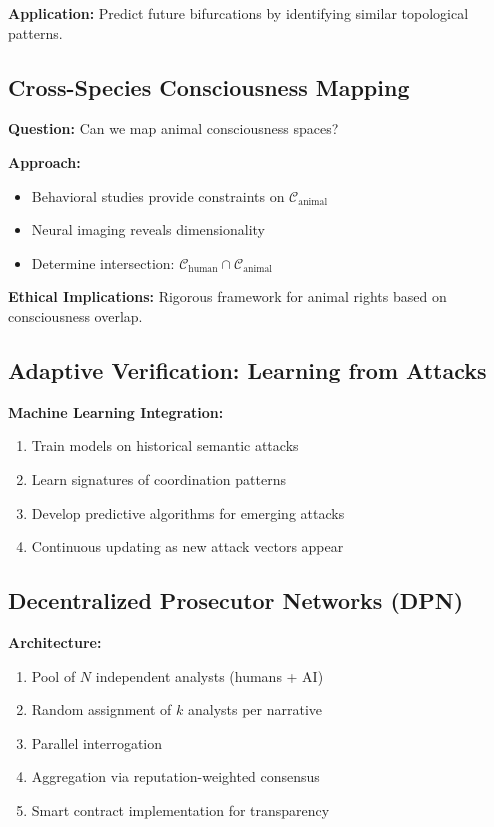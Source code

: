 \documentclass[11pt,a4paper]{article}
\theoremstyle{definition}
\theoremstyle{remark}
\newcommand{\CC}{\mathcal{C}}
\begin{document}
\textbf{Application:} Predict future bifurcations by identifying similar topological patterns.

\subsection{Cross-Species Consciousness Mapping}

\textbf{Question:} Can we map animal consciousness spaces?

\textbf{Approach:}
\begin{itemize}
\item Behavioral studies provide constraints on $\CC_{\text{animal}}$
\item Neural imaging reveals dimensionality
\item Determine intersection: $\CC_{\text{human}} \cap \CC_{\text{animal}}$
\end{itemize}

\textbf{Ethical Implications:} Rigorous framework for animal rights based on consciousness overlap.

\subsection{Adaptive Verification: Learning from Attacks}

\textbf{Machine Learning Integration:}
\begin{enumerate}
\item Train models on historical semantic attacks
\item Learn signatures of coordination patterns
\item Develop predictive algorithms for emerging attacks
\item Continuous updating as new attack vectors appear
\end{enumerate}

\subsection{Decentralized Prosecutor Networks (DPN)}

\textbf{Architecture:}
\begin{enumerate}
\item Pool of $N$ independent analysts (humans + AI)
\item Random assignment of $k$ analysts per narrative
\item Parallel interrogation
\item Aggregation via reputation-weighted consensus
\item Smart contract implementation for transparency
\end{enumerate}
\end{document}
